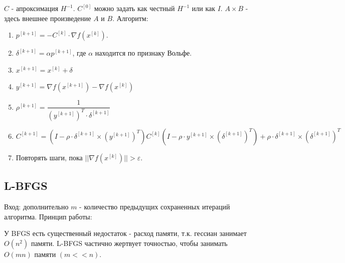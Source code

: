 \documentclass[a4paper,14pt,oneside,openany]{memoir}
\begin{document}
$C$ - апроксимация $H^{-1}$. $C^{[0]}$ можно задать как честный $H^{-1}$ или как $I$.
$A \times B$ - здесь внешнее произведение $A$ и $B$.
Алгоритм:
\begin{enumerate}
	\item $p^{[k + 1]} = -C^{[k]} \cdot \nabla f(x^{[k]})$.
	\item $\delta^{[k + 1]} = \alpha p^{[k + 1]}$, где $\alpha$ находится по признаку Вольфе.
	\item $x^{[k + 1]} = x^{[k]} + \delta$ 
	\item $y^{[k + 1]} =  \nabla f(x^{[k + 1]}) - \nabla f(x^{[k]})$
	\item $\rho^{[k + 1]} = \dfrac{1}{(y^{[k + 1]})^T \cdot\delta^{[k + 1]}}$
	\item $C^{[k + 1]} = (I - \rho \cdot \delta^{[k + 1]} \times (y^{[k + 1]})^T)C^{[k]}(I - \rho \cdot y^{[k + 1]} \times (\delta^{[k + 1]})^T) + \rho \cdot \delta^{[k + 1]} \times (\delta^{[k + 1]})^T$
	\item Повторять шаги, пока  $||\nabla f(x^{[k]})|| > \varepsilon$.
\end{enumerate}

\subsection {L-BFGS}

Вход: дополнительно $m$ - количество предыдущих сохраненных итераций алгоритма.
Принцип работы: 


У BFGS есть существенный недостаток - расход памяти, т.к. гессиан занимает $O(n^2)$ памяти. L-BFGS частично жертвует точностью, чтобы занимать $O(mn)$ памяти $(m << n)$.
\end{document}
